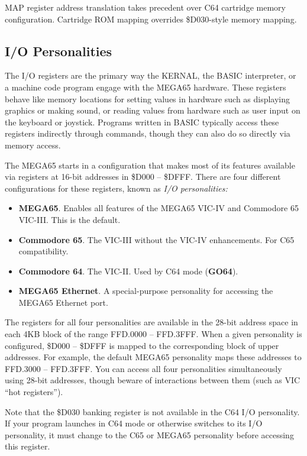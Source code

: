 MAP register address translation takes precedent over C64 cartridge memory configuration. Cartridge ROM mapping overrides \$D030-style memory mapping.

\subsection{I/O Personalities}

The I/O registers are the primary way the KERNAL, the BASIC interpreter, or a machine code program engage with the MEGA65 hardware. These registers behave like memory locations for setting values in hardware such as displaying graphics or making sound, or reading values from hardware such as user input on the keyboard or joystick. Programs written in BASIC typically access these registers indirectly through commands, though they can also do so directly via memory access.

The MEGA65 starts in a configuration that makes most of its features available via registers at 16-bit addresses in \$D000 -- \$DFFF. There are four different configurations for these registers, known as {\em I/O personalities:}

\begin{itemize}
\item {\bf MEGA65}. Enables all features of the MEGA65 VIC-IV and Commodore 65 VIC-III. This is the default.
\item {\bf Commodore 65}. The VIC-III without the VIC-IV enhancements. For C65 compatibility.
\item {\bf Commodore 64}. The VIC-II. Used by C64 mode (\textbf{GO64}).
\item {\bf MEGA65 Ethernet}. A special-purpose personality for accessing the MEGA65 Ethernet port.
\end{itemize}

The registers for all four personalities are available in the 28-bit address space in each 4KB block of the range FFD.0000 -- FFD.3FFF. When a given personality is configured, \$D000 -- \$DFFF is mapped to the corresponding block of upper addresses. For example, the default MEGA65 personality maps these addresses to FFD.3000 -- FFD.3FFF. You can access all four personalities simultaneously using 28-bit addresses, though beware of interactions between them (such as VIC ``hot registers'').

Note that the \$D030 banking register is not available in the C64 I/O personality. If your program launches in C64 mode or otherwise switches to its I/O personality, it must change to the C65 or MEGA65 personality before accessing this register.

